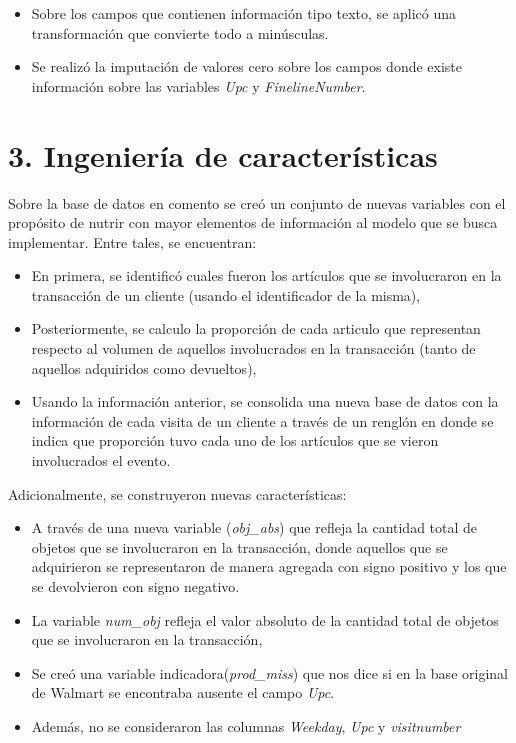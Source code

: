 \documentclass[]{book}
\providecommand{\tightlist}{%
  \setlength{\itemsep}{0pt}\setlength{\parskip}{0pt}}
\begin{document}
\begin{itemize}
\tightlist
\item
  Sobre los campos que contienen información tipo texto, se aplicó una transformación que convierte todo a minúsculas.
\item
  Se realizó la imputación de valores cero sobre los campos donde existe información sobre las variables \emph{Upc} y \emph{FinelineNumber}.
\end{itemize}

\hypertarget{ingenieruxeda-de-caracteruxedsticas}{%
\section{3. Ingeniería de características}\label{ingenieruxeda-de-caracteruxedsticas}}

Sobre la base de datos en comento se creó un conjunto de nuevas variables con el propósito de nutrir con mayor elementos de información al modelo que se busca implementar. Entre tales, se encuentran:

\begin{itemize}
\tightlist
\item
  En primera, se identificó cuales fueron los artículos que se involucraron en la transacción de un cliente (usando el identificador de la misma),
\item
  Posteriormente, se calculo la proporción de cada articulo que representan respecto al volumen de aquellos involucrados en la transacción (tanto de aquellos adquiridos como devueltos),
\item
  Usando la información anterior, se consolida una nueva base de datos con la información de cada visita de un cliente a través de un renglón en donde se indica que proporción tuvo cada uno de los artículos que se vieron involucrados el evento.
\end{itemize}

Adicionalmente, se construyeron nuevas características:

\begin{itemize}
\tightlist
\item
  A través de una nueva variable (\emph{obj\_abs}) que refleja la cantidad total de objetos que se involucraron en la transacción, donde aquellos que se adquirieron se representaron de manera agregada con signo positivo y los que se devolvieron con signo negativo.
\item
  La variable \emph{num\_obj} refleja el valor absoluto de la cantidad total de objetos que se involucraron en la transacción,
\item
  Se creó una variable indicadora(\emph{prod\_miss}) que nos dice si en la base original de Walmart se encontraba ausente el campo \emph{Upc}.
\item
  Además, no se consideraron las columnas \emph{Weekday}, \emph{Upc} y \emph{visitnumber}
\end{itemize}
\end{document}
